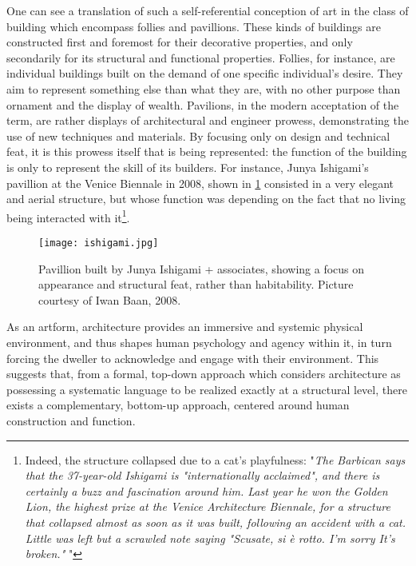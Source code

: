 One can see a translation of such a self-referential conception of art in the class of building which encompass follies and pavillions. These kinds of buildings are constructed first and foremost for their decorative properties, and only secondarily for its structural and functional properties. Follies, for instance, are individual buildings built on the demand of one specific individual's desire. They aim to represent something else than what they are, with no other purpose than ornament and the display of wealth. Pavilions, in the modern acceptation of the term, are rather displays of architectural and engineer prowess, demonstrating the use of new techniques and materials. By focusing only on design and technical feat, it is this prowess itself that is being represented: the function of the building is only to represent the skill of its builders. For instance, Junya Ishigami's pavillion at the Venice Biennale in 2008, shown in \ref{graphic:pavillion} consisted in a very elegant and aerial structure, but whose function was depending on the fact that no living being interacted with it\footnote{Indeed, the structure collapsed due to a cat's playfulness: "\emph{The Barbican says that the 37-year-old Ishigami is "internationally acclaimed", and there is certainly a buzz and fascination around him. Last year he won the Golden Lion, the highest prize at the Venice Architecture Biennale, for a structure that collapsed almost as soon as it was built, following an accident with a cat. Little was left but a scrawled note saying "Scusate, si è rotto. I'm sorry It's broken." } \citep{moore_junya_2011}"}.

\begin{figure}
    \texttt{[image: ishigami.jpg]}
    \caption{Pavillion built by Junya Ishigami + associates, showing a focus on appearance and structural feat, rather than habitability. Picture courtesy of Iwan Baan, 2008.}
    \label{graphic:pavillion}
\end{figure}

As an artform, architecture provides an immersive and systemic physical environment, and thus shapes human psychology and agency within it, in turn forcing the dweller to acknowledge and engage with their environment. This suggests that, from a formal, top-down approach which considers architecture as possessing a systematic language to be realized exactly at a structural level, there exists a complementary, bottom-up approach, centered around human construction and function.

